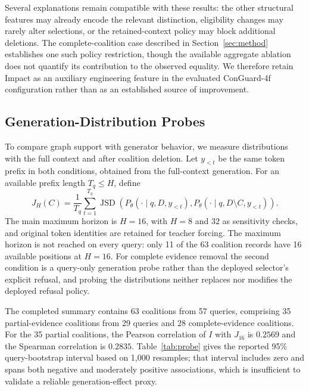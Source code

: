 \documentclass[sigconf]{aamas}
\begin{document}
Several explanations remain compatible with these results: the other structural features may already encode the relevant distinction, eligibility changes may rarely alter selections, or the retained-context policy may block additional deletions. The complete-coalition case described in Section~\ref{sec:method} establishes one such policy restriction, though the available aggregate ablation does not quantify its contribution to the observed equality. We therefore retain Impact as an auxiliary engineering feature in the evaluated ConGuard-4f configuration rather than as an established source of improvement.

\subsection{Generation-Distribution Probes}
\label{sec:probe}
To compare graph support with generator behavior, we measure distributions with the full context and after coalition deletion. Let $y_{<t}$ be the same token prefix in both conditions, obtained from the full-context generation. For an available prefix length $T_q\leq H$, define
\begin{equation}
J_H(C)=\frac{1}{T_q}\sum_{t=1}^{T_q}\operatorname{JSD}\!\left(
P_\theta(\cdot\mid q,D,y_{<t}),
P_\theta(\cdot\mid q,D\setminus C,y_{<t})\right).
\label{eq:probe}
\end{equation}
The main maximum horizon is $H=16$, with $H=8$ and $32$ as sensitivity checks, and original token identities are retained for teacher forcing. The maximum horizon is not reached on every query: only 11 of the 63 coalition records have 16 available positions at $H=16$. For complete evidence removal the second condition is a query-only generation probe rather than the deployed selector's explicit refusal, and probing the distributions neither replaces nor modifies the deployed refusal policy.

The completed summary contains 63 coalitions from 57 queries, comprising 35 partial-evidence coalitions from 29 queries and 28 complete-evidence coalitions. For the 35 partial coalitions, the Pearson correlation of $I$ with $J_{16}$ is $0.2569$ and the Spearman correlation is $0.2835$. Table~\ref{tab:probe} gives the reported 95\% query-bootstrap interval based on 1,000 resamples; that interval includes zero and spans both negative and moderately positive associations, which is insufficient to validate a reliable generation-effect proxy.
\end{document}
